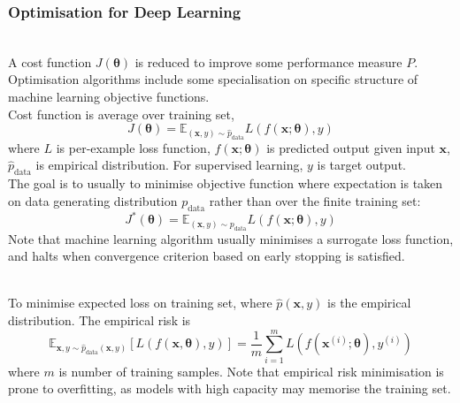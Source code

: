 \subsubsection{Optimisation for Deep Learning}

\begin{remark} \\
A cost function $J(\bm{\theta})$ is reduced to improve some performance measure $P$.\\
Optimisation algorithms include some specialisation on specific structure of machine learning objective functions.\\
Cost function is average over training set,
\begin{equation*}
J(\bm{\theta}) = \mathbb{E}_{(\bm{x}, y) \sim \hat{p}_{\text{data}}} L(f(\bm{x}; \bm{\theta}), y) \nonumber
\end{equation*}
where $L$ is per-example loss function, $f(\bm{x}; \bm{\theta})$ is predicted output given input $\bm{x}$, $\hat{p}_{\text{data}}$ is empirical distribution. For supervised learning, $y$ is target output.\\
The goal is to usually to minimise objective function where expectation is taken on data generating distribution $p_{\text{data}}$ rather than over the finite training set:
\begin{equation*}
J^*(\bm{\theta}) = \mathbb{E}_{(\bm{x}, y) \sim p_{\text{data}}} L(f(\bm{x}; \bm{\theta}), y) \nonumber
\end{equation*}
Note that machine learning algorithm usually minimises a surrogate loss function, and halts when convergence criterion based on early  stopping is satisfied.
\end{remark}

\begin{definition} \\
To minimise expected loss on training set, where $\hat{p}(\bm{x}, y)$ is the empirical distribution. The empirical risk is
\begin{equation*}
\mathbb{E}_{\bm{x}, y \sim \hat{p}_{\text{data}}(\bm{x}, y)}[L(f(\bm{x}, \bm{\theta}), y)] = \frac{1}{m} \sum\limits_{i=1}^m L(f(\bm{x}^{(i)}; \bm{\theta}), y^{(i)}) \nonumber
\end{equation*}
where $m$ is number of training samples. Note that empirical risk minimisation is prone to overfitting, as models with high capacity may memorise the training set.
\end{definition}

